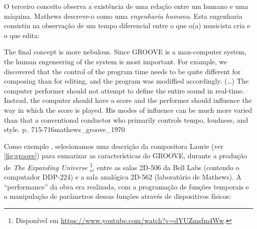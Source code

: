 O terceiro conceito observa a existência de uma relação entre um humano e uma máquina. Mathews descreve-o como uma \emph{engenharia humana}. Esta engenharia consistiu na observação de um tempo diferencial entre o que o(a) musicista cria e o que edita:

{
The final concept is more nebulous. Since GROOVE is a man-computer system, the human engeneering of the system is most important. For example, we discovered that the control of the program time needs to be quite different for composing than for editing, and the program was modiffied accordingly. (\ldots) The computer performer should not attempt to define the entire sound in real-time. Instead, the computer should have a score and the performer should influence the way in which the score is played. His modes of influence can be much more varied than that a conventional conductor who primarily controls tempo, loudness, and style.
}
{p.~715-716}{mathews_groove_1970}

Como exemplo , selecionamos uma descrição da compositora Laurie  (ver \autoref{fig:groove}) para sumarizar as características do GROOVE, durante a produção de \emph{The Expanding Universe} \footnote{Disponível em \url{https://www.youtube.com/watch?v=dYUZmsfm4Ww}.}, entre as salas 2D-506 da Bell Labs (contendo o computador DDP-224) e a sala analógica 2D-562 (laboratório de Mathews). A ``performance'' da obra era realizada, com a programação de funções temporais e a manipulação de parâmetros dessas funções através de dispositivos físicos:

